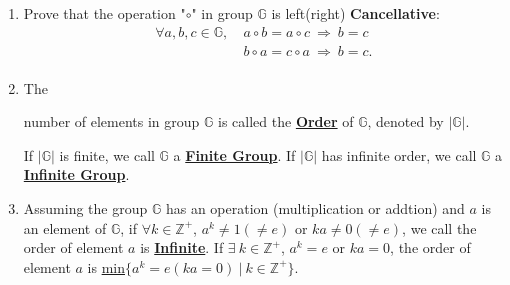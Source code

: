 \documentclass[12pt]{scrartcl}
\begin{document}
{{\begin{enumerate}[label=(\alph*)]
	\item Prove that the operation "$\circ$" in group $\mathbb{G}$ is left(right) \textbf{Cancellative}: 
	\begin{align*}
	\forall a, b, c \in \mathbb{G}, ~ &a \circ b = a \circ c ~ \Longrightarrow ~ b = c \\
	&b \circ a = c \circ a ~ \Longrightarrow ~ b = c.\\
	\end{align*}
\vspace{-1em}
\begin{spacing}{1.3}
\end{spacing}


	\item \begin{spacing}{1.3}The \rule{0pt}{20pt}number of elements in group $\mathbb{G}$ is called the \underline{\textbf{Order}} of $\mathbb{G}$, denoted by $|\mathbb{G}|$. 

If $|\mathbb{G}|$ is finite, we call $\mathbb{G}$ a \underline{\textbf{Finite Group}}.  If $|\mathbb{G}|$ has infinite order, we call $\mathbb{G}$ a \underline{\textbf{Infinite Group}}.\end{spacing}


	\item \begin{spacing}{1.3}Assuming the group $\mathbb{G}$ has an operation (multiplication or addtion) and $a$ is an element of $\mathbb{G}$, if $\forall k \in \mathbb{Z}^+$, $a^{k} \neq 1 (\neq e)$ or $ka \neq 0 (\neq e)$, we call the order of element $a$ is \underline{\textbf{Infinite}\vphantom{y}}. If $\exists ~ k \in \mathbb{Z}^+$, $a^{k} = e$ or $ka = 0$, the order of element $a$ is \underline{min$\{a^{k} = e (ka = 0) ~ | ~ k \in \mathbb{Z}^+\}$}. \end{spacing}



\end{enumerate}}}
\end{document}
